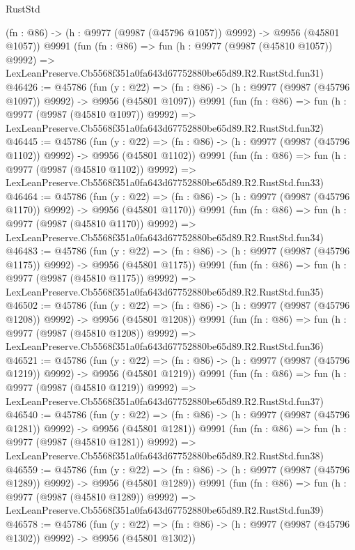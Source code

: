 \begin{lexlean}{RustStd}
\begin{coremodule}
    (fn : @86) -> (h : @9977 (@9987 (@45796 @1057)) @9992) -> @9956 (@45801 @1057))
    @9991
    (fun (fn : @86) =>
    fun (h : @9977 (@9987 (@45810 @1057)) @9992) =>
    LexLeanPreserve.Cb5568f351a0fa643d67752880be65d89.R2.RustStd.fun31)
@46426 := @45786
    (fun (y : @22) =>
    (fn : @86) -> (h : @9977 (@9987 (@45796 @1097)) @9992) -> @9956 (@45801 @1097))
    @9991
    (fun (fn : @86) =>
    fun (h : @9977 (@9987 (@45810 @1097)) @9992) =>
    LexLeanPreserve.Cb5568f351a0fa643d67752880be65d89.R2.RustStd.fun32)
@46445 := @45786
    (fun (y : @22) =>
    (fn : @86) -> (h : @9977 (@9987 (@45796 @1102)) @9992) -> @9956 (@45801 @1102))
    @9991
    (fun (fn : @86) =>
    fun (h : @9977 (@9987 (@45810 @1102)) @9992) =>
    LexLeanPreserve.Cb5568f351a0fa643d67752880be65d89.R2.RustStd.fun33)
@46464 := @45786
    (fun (y : @22) =>
    (fn : @86) -> (h : @9977 (@9987 (@45796 @1170)) @9992) -> @9956 (@45801 @1170))
    @9991
    (fun (fn : @86) =>
    fun (h : @9977 (@9987 (@45810 @1170)) @9992) =>
    LexLeanPreserve.Cb5568f351a0fa643d67752880be65d89.R2.RustStd.fun34)
@46483 := @45786
    (fun (y : @22) =>
    (fn : @86) -> (h : @9977 (@9987 (@45796 @1175)) @9992) -> @9956 (@45801 @1175))
    @9991
    (fun (fn : @86) =>
    fun (h : @9977 (@9987 (@45810 @1175)) @9992) =>
    LexLeanPreserve.Cb5568f351a0fa643d67752880be65d89.R2.RustStd.fun35)
@46502 := @45786
    (fun (y : @22) =>
    (fn : @86) -> (h : @9977 (@9987 (@45796 @1208)) @9992) -> @9956 (@45801 @1208))
    @9991
    (fun (fn : @86) =>
    fun (h : @9977 (@9987 (@45810 @1208)) @9992) =>
    LexLeanPreserve.Cb5568f351a0fa643d67752880be65d89.R2.RustStd.fun36)
@46521 := @45786
    (fun (y : @22) =>
    (fn : @86) -> (h : @9977 (@9987 (@45796 @1219)) @9992) -> @9956 (@45801 @1219))
    @9991
    (fun (fn : @86) =>
    fun (h : @9977 (@9987 (@45810 @1219)) @9992) =>
    LexLeanPreserve.Cb5568f351a0fa643d67752880be65d89.R2.RustStd.fun37)
@46540 := @45786
    (fun (y : @22) =>
    (fn : @86) -> (h : @9977 (@9987 (@45796 @1281)) @9992) -> @9956 (@45801 @1281))
    @9991
    (fun (fn : @86) =>
    fun (h : @9977 (@9987 (@45810 @1281)) @9992) =>
    LexLeanPreserve.Cb5568f351a0fa643d67752880be65d89.R2.RustStd.fun38)
@46559 := @45786
    (fun (y : @22) =>
    (fn : @86) -> (h : @9977 (@9987 (@45796 @1289)) @9992) -> @9956 (@45801 @1289))
    @9991
    (fun (fn : @86) =>
    fun (h : @9977 (@9987 (@45810 @1289)) @9992) =>
    LexLeanPreserve.Cb5568f351a0fa643d67752880be65d89.R2.RustStd.fun39)
@46578 := @45786
    (fun (y : @22) =>
    (fn : @86) -> (h : @9977 (@9987 (@45796 @1302)) @9992) -> @9956 (@45801 @1302))

\end{coremodule}
\end{lexlean}
